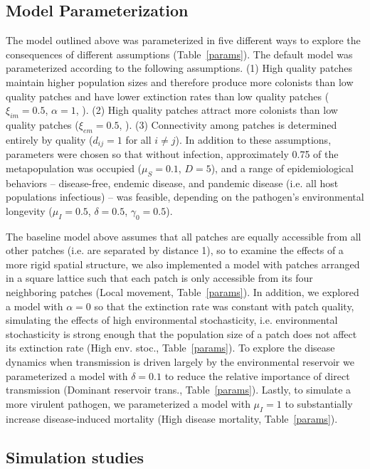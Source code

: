 \documentclass{article}
\begin{document}
\subsection{Model Parameterization}

The model outlined above was parameterized in five different ways to explore the consequences of different assumptions (Table~\ref{params}).  The default model was parameterized  according to the following assumptions. (1) High quality patches maintain higher population sizes and therefore produce more colonists than low quality patches and have lower extinction rates than low quality patches ($\xi_{im}=0.5$, $\alpha=1$, \cite{Hanski2003}).  (2) High quality patches attract more colonists than low quality patches ($\xi_{em}=0.5$, \cite{Hanski2003}).  (3)  Connectivity among patches is determined entirely by quality ($d_{ij}=1$ for all $i \neq j$).  In addition to these assumptions, parameters were chosen so that without infection, approximately 0.75 of the metapopulation was occupied ($\mu_S = 0.1$, $D=5$), and a range of epidemiological behaviors -- disease-free, endemic disease, and pandemic disease (i.e. all host populations infectious) -- was feasible, depending on the pathogen's environmental longevity ($\mu_I = 0.5$, $\delta = 0.5$, $\gamma_0 = 0.5$). 

The baseline model above assumes that all patches are equally accessible from all other patches (i.e. are separated by distance 1), so to examine the effects of a more rigid spatial structure, we also implemented a model with patches arranged in a square lattice such that each patch is only accessible from its four neighboring patches (Local movement, Table~\ref{params}).  In addition, we explored a model with $\alpha = 0$ so that the extinction rate was constant with patch quality, simulating the effects of high environmental stochasticity, i.e. environmental stochasticity is strong enough that the population size of a patch does not affect its extinction rate (High env. stoc., Table~\ref{params}).  To explore the disease dynamics when transmission is driven largely by the environmental reservoir we parameterized a model with $\delta = 0.1$ to reduce the relative importance of direct transmission (Dominant reservoir trans., Table~\ref{params}).  Lastly, to simulate a more virulent pathogen, we parameterized a model with $\mu_I = 1$ to substantially increase disease-induced mortality (High disease mortality, Table~\ref{params}).

\subsection{Simulation studies}
\end{document}
